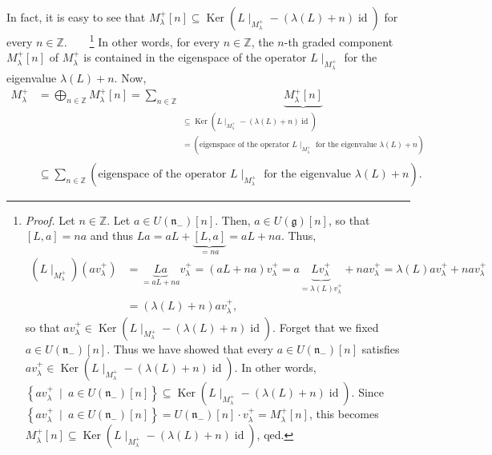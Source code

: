 \documentclass
[numbers=enddot,12pt,final,onecolumn,german,notitlepage]{scrartcl}%
\theoremstyle{definition}
\begin{document}
In fact, it is easy to see that $M_{\lambda}^{+}\left[  n\right]
\subseteq\operatorname*{Ker}\left(  L\mid_{M_{\lambda}^{+}}-\left(
\lambda\left(  L\right)  +n\right)  \operatorname*{id}\right)  $ for every
$n\in\mathbb{Z}$.\ \ \ \ \footnote{\textit{Proof.} Let $n\in\mathbb{Z}$. Let
$a\in U\left(  \mathfrak{n}_{-}\right)  \left[  n\right]  $. Then, $a\in
U\left(  \mathfrak{g}\right)  \left[  n\right]  $, so that $\left[
L,a\right]  =na$ and thus $La=aL+\underbrace{\left[  L,a\right]  }%
_{=na}=aL+na$. Thus,%
\begin{align*}
\left(  L\mid_{M_{\lambda}^{+}}\right)  \left(  av_{\lambda}^{+}\right)   &
=\underbrace{La}_{=aL+na}v_{\lambda}^{+}=\left(  aL+na\right)  v_{\lambda}%
^{+}=a\underbrace{Lv_{\lambda}^{+}}_{=\lambda\left(  L\right)  v_{\lambda}%
^{+}}+nav_{\lambda}^{+}=\lambda\left(  L\right)  av_{\lambda}^{+}%
+nav_{\lambda}^{+}\\
&  =\left(  \lambda\left(  L\right)  +n\right)  av_{\lambda}^{+},
\end{align*}
so that $av_{\lambda}^{+}\in\operatorname*{Ker}\left(  L\mid_{M_{\lambda}^{+}%
}-\left(  \lambda\left(  L\right)  +n\right)  \operatorname*{id}\right)  $.
Forget that we fixed $a\in U\left(  \mathfrak{n}_{-}\right)  \left[  n\right]
$. Thus we have showed that every $a\in U\left(  \mathfrak{n}_{-}\right)
\left[  n\right]  $ satisfies $av_{\lambda}^{+}\in\operatorname*{Ker}\left(
L\mid_{M_{\lambda}^{+}}-\left(  \lambda\left(  L\right)  +n\right)
\operatorname*{id}\right)  $. In other words, $\left\{  av_{\lambda}^{+}%
\ \mid\ a\in U\left(  \mathfrak{n}_{-}\right)  \left[  n\right]  \right\}
\subseteq\operatorname*{Ker}\left(  L\mid_{M_{\lambda}^{+}}-\left(
\lambda\left(  L\right)  +n\right)  \operatorname*{id}\right)  $. Since
$\left\{  av_{\lambda}^{+}\ \mid\ a\in U\left(  \mathfrak{n}_{-}\right)
\left[  n\right]  \right\}  =U\left(  \mathfrak{n}_{-}\right)  \left[
n\right]  \cdot v_{\lambda}^{+}=M_{\lambda}^{+}\left[  n\right]  $, this
becomes $M_{\lambda}^{+}\left[  n\right]  \subseteq\operatorname*{Ker}\left(
L\mid_{M_{\lambda}^{+}}-\left(  \lambda\left(  L\right)  +n\right)
\operatorname*{id}\right)  $, qed.} In other words, for every $n\in\mathbb{Z}%
$, the $n$-th graded component $M_{\lambda}^{+}\left[  n\right]  $ of
$M_{\lambda}^{+}$ is contained in the eigenspace of the operator
$L\mid_{M_{\lambda}^{+}}$ for the eigenvalue $\lambda\left(  L\right)  +n$.
Now,%
\begin{align*}
M_{\lambda}^{+}  &  =\bigoplus\limits_{n\in\mathbb{Z}}M_{\lambda}^{+}\left[
n\right]  =\sum\limits_{n\in\mathbb{Z}}\underbrace{M_{\lambda}^{+}\left[
n\right]  }_{\substack{\subseteq\operatorname*{Ker}\left(  L\mid_{M_{\lambda
}^{+}}-\left(  \lambda\left(  L\right)  +n\right)  \operatorname*{id}\right)
\\=\left(  \text{eigenspace of the operator }L\mid_{M_{\lambda}^{+}}\text{ for
the eigenvalue }\lambda\left(  L\right)  +n\right)  }}\\
&  \subseteq\sum\limits_{n\in\mathbb{Z}}\left(  \text{eigenspace of the
operator }L\mid_{M_{\lambda}^{+}}\text{ for the eigenvalue }\lambda\left(
L\right)  +n\right)  .
\end{align*}
\end{document}
